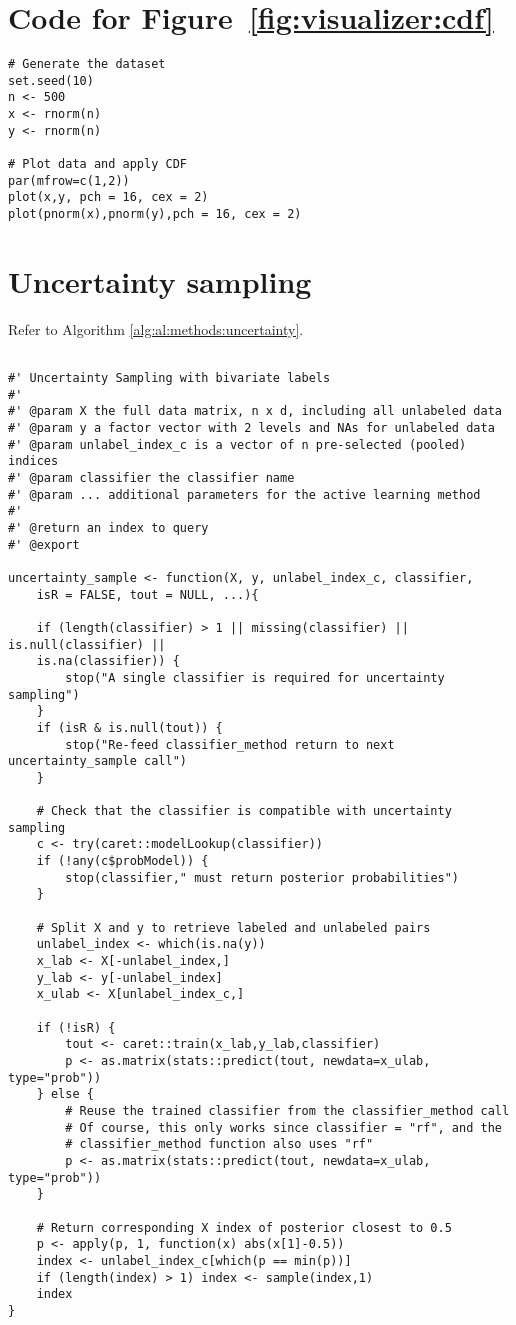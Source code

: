 \section{Code for Figure~\ref{fig:visualizer:cdf}}
\label{sec:appendicies:cdf}
{
\begin{lstlisting}
# Generate the dataset
set.seed(10)
n <- 500
x <- rnorm(n)
y <- rnorm(n)

# Plot data and apply CDF
par(mfrow=c(1,2))
plot(x,y, pch = 16, cex = 2)
plot(pnorm(x),pnorm(y),pch = 16, cex = 2)
\end{lstlisting}
}




\section{Uncertainty sampling}
\label{sec:appendicies:al:uncertainty}

Refer to Algorithm \ref{alg:al:methods:uncertainty}. 
{
\begin{lstlisting}

#' Uncertainty Sampling with bivariate labels
#'
#' @param X the full data matrix, n x d, including all unlabeled data
#' @param y a factor vector with 2 levels and NAs for unlabeled data
#' @param unlabel_index_c is a vector of n pre-selected (pooled) indices
#' @param classifier the classifier name
#' @param ... additional parameters for the active learning method
#'
#' @return an index to query
#' @export

uncertainty_sample <- function(X, y, unlabel_index_c, classifier,
	isR = FALSE, tout = NULL, ...){

	if (length(classifier) > 1 || missing(classifier) || is.null(classifier) || 
	is.na(classifier)) {
		stop("A single classifier is required for uncertainty sampling")
	}
	if (isR & is.null(tout)) {
		stop("Re-feed classifier_method return to next uncertainty_sample call")
	}	
	
	# Check that the classifier is compatible with uncertainty sampling
	c <- try(caret::modelLookup(classifier))
	if (!any(c$probModel)) {
		stop(classifier," must return posterior probabilities")
	}
	
	# Split X and y to retrieve labeled and unlabeled pairs
	unlabel_index <- which(is.na(y))
	x_lab <- X[-unlabel_index,]
	y_lab <- y[-unlabel_index]
	x_ulab <- X[unlabel_index_c,]
	
	if (!isR) {
		tout <- caret::train(x_lab,y_lab,classifier)
		p <- as.matrix(stats::predict(tout, newdata=x_ulab, type="prob"))
	} else {
		# Reuse the trained classifier from the classifier_method call
		# Of course, this only works since classifier = "rf", and the
		# classifier_method function also uses "rf"
		p <- as.matrix(stats::predict(tout, newdata=x_ulab, type="prob"))
	}
	
	# Return corresponding X index of posterior closest to 0.5
	p <- apply(p, 1, function(x) abs(x[1]-0.5))
	index <- unlabel_index_c[which(p == min(p))]
	if (length(index) > 1) index <- sample(index,1)
	index
}
\end{lstlisting}
}

